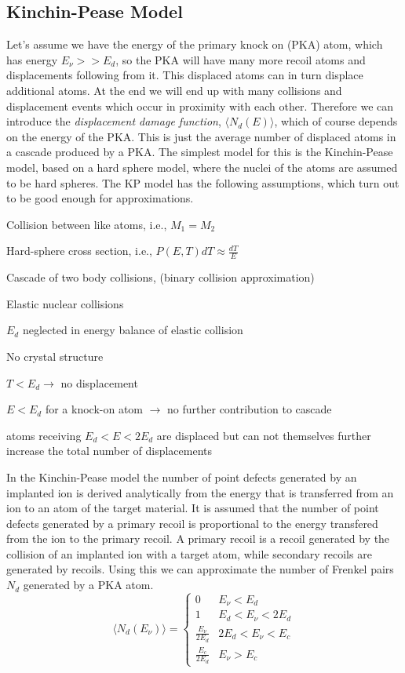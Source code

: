 \subsection{Kinchin-Pease Model}\label{subsec:kinchin-pease-model}
Let's assume we have the energy of the primary knock on (PKA) atom, which has energy $E_\nu >> E_d$, so the PKA will have many more recoil atoms and displacements following from it.
This displaced atoms can in turn displace additional atoms.
At the end we will end up with many collisions and displacement events which occur in proximity with each other.
Therefore we can introduce the \textit{displacement damage function}, $\langle N_d (E) \rangle $, which of course depends on the energy of the PKA.
This is just the average number of displaced atoms in a cascade produced by a PKA.
The simplest model for this is the Kinchin-Pease model, based on a hard sphere model, where the nuclei of the atoms are assumed to be hard spheres.
The KP model has the following assumptions, which turn out to be good enough for approximations.

\begin{myitemize}
	\item Collision between like atoms,  i.e., $M_1 = M_2$
	\item Hard-sphere cross section, i.e., $P(E,T)dT \approx \frac{dT}{E}$
	\item Cascade of two body collisions, (binary collision approximation)
	\item Elastic nuclear collisions
	\item $E_d$ neglected in energy balance of elastic collision
	\item No crystal structure
	\item $T < E_d \rightarrow $ no displacement
	\item $E < E_d$ for a knock-on atom $\rightarrow $ no further contribution to cascade
	\item atoms receiving $E_d< E < 2E_d$ are displaced but can not themselves further increase the total number of displacements
\end{myitemize}
In the Kinchin-Pease model the number of point defects generated by an implanted ion is derived analytically from the energy that is transferred from an ion to an atom of the target material.
It is assumed that the number of point defects generated by a primary recoil is proportional to the energy transfered from the ion to the primary recoil.
A primary recoil is a recoil generated by the collision of an implanted ion with a target atom, while secondary recoils are generated by recoils.
Using this we can approximate the number of Frenkel pairs $N_d$ generated by a PKA atom.
$$ \langle N_d (E_\nu) \rangle = \begin{cases}
			 0 & E_\nu < E_d \\
			 1 &  E_d < E_\nu < 2E_d \\
			 \frac{E_\nu}{2E_d} & 2E_d < E_{\nu} < E_c \\
			 \frac{E_c}{2E_d} & E_{\nu} > E_c
\end{cases} $$

